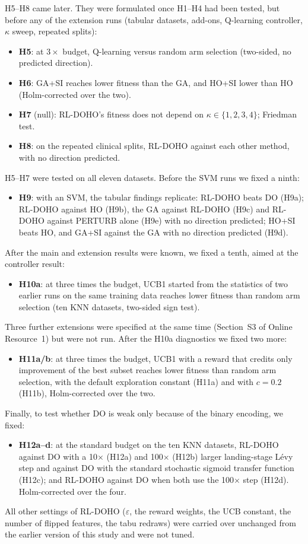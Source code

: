 \documentclass[pdflatex,sn-basic]{sn-jnl}
\begin{document}
H5--H8 came later. They were formulated once H1--H4 had been tested, but before any of the extension runs (tabular datasets, add-ons, Q-learning controller, $\kappa$ sweep, repeated splits):
\begin{itemize}
\item \textbf{H5}: at $3\times$ budget, Q-learning versus random arm selection (two-sided, no predicted direction).
\item \textbf{H6}: GA+SI reaches lower fitness than the GA, and HO+SI lower than HO (Holm-corrected over the two).
\item \textbf{H7} (null): RL-DOHO's fitness does not depend on $\kappa\in\{1,2,3,4\}$; Friedman test.
\item \textbf{H8}: on the repeated clinical splits, RL-DOHO against each other method, with no direction predicted.
\end{itemize}
H5--H7 were tested on all eleven datasets. Before the SVM runs we fixed a ninth:
\begin{itemize}
\item \textbf{H9}: with an SVM, the tabular findings replicate: RL-DOHO beats DO (H9a); RL-DOHO against HO (H9b), the GA against RL-DOHO (H9c) and RL-DOHO against PERTURB alone (H9e) with no direction predicted; HO+SI beats HO, and GA+SI against the GA with no direction predicted (H9d).
\end{itemize}
After the main and extension results were known, we fixed a tenth, aimed at the controller result:
\begin{itemize}
\item \textbf{H10a}: at three times the budget, UCB1 started from the statistics of two earlier runs on the same training data reaches lower fitness than random arm selection (ten KNN datasets, two-sided sign test).
\end{itemize}
Three further extensions were specified at the same time (Section~S3 of Online Resource~1) but were not run. After the H10a diagnostics we fixed two more:
\begin{itemize}
\item \textbf{H11a/b}: at three times the budget, UCB1 with a reward that credits only improvement of the best subset reaches lower fitness than random arm selection, with the default exploration constant (H11a) and with $c=0.2$ (H11b), Holm-corrected over the two.
\end{itemize}
Finally, to test whether DO is weak only because of the binary encoding, we fixed:
\begin{itemize}
\item \textbf{H12a--d}: at the standard budget on the ten KNN datasets, RL-DOHO against DO with a 10$\times$ (H12a) and 100$\times$ (H12b) larger landing-stage L\'evy step and against DO with the standard stochastic sigmoid transfer function \citep{kennedy1997,mirjalili2013sv} (H12c); and RL-DOHO against DO when both use the 100$\times$ step (H12d). Holm-corrected over the four.
\end{itemize}
All other settings of RL-DOHO ($\varepsilon$, the reward weights, the UCB constant, the number of flipped features, the tabu redraws) were carried over unchanged from the earlier version of this study and were not tuned.
\end{document}
